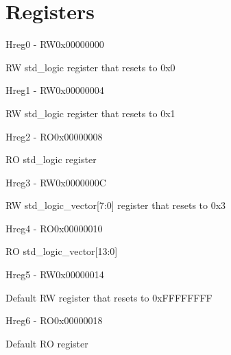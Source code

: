 \documentclass{article}
\begin{document}
\section{Registers}

\begin{register}{H}{reg0 - RW}{0x00000000}  \par RW std{\_}logic register that resets to 0x0 \regnewline
  \label{reg0}
\regnewline
\end{register}

\begin{register}{H}{reg1 - RW}{0x00000004}  \par RW std{\_}logic register that resets to 0x1 \regnewline
  \label{reg1}
\regnewline
\end{register}

\begin{register}{H}{reg2 - RO}{0x00000008}  \par RO std{\_}logic register \regnewline
  \label{reg2}
\regnewline
\end{register}

\begin{register}{H}{reg3 - RW}{0x0000000C}  \par RW std{\_}logic{\_}vector[7:0] register that resets to 0x3 \regnewline
  \label{reg3}
\regnewline
\end{register}

\begin{register}{H}{reg4 - RO}{0x00000010}  \par RO std{\_}logic{\_}vector[13:0] \regnewline
  \label{reg4}
\regnewline
\end{register}

\begin{register}{H}{reg5 - RW}{0x00000014}  \par Default RW register that resets to 0xFFFFFFFF \regnewline
  \label{reg5}
\regnewline
\end{register}

\begin{register}{H}{reg6 - RO}{0x00000018}  \par Default RO register \regnewline
  \label{reg6}
\regnewline
\end{register}
\end{document}
